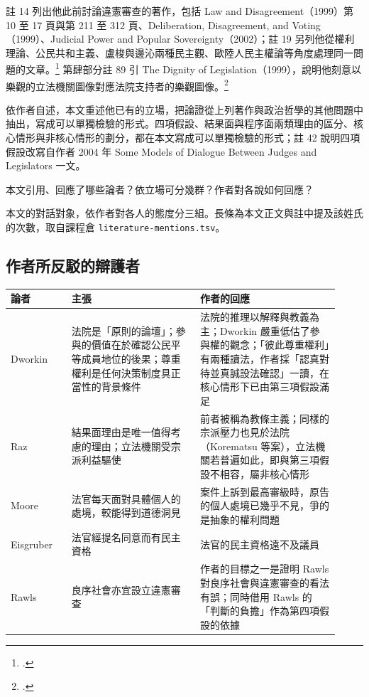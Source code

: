 註 14 列出他此前討論違憲審查的著作，包括 Law and Disagreement（1999）第 10 至 17 頁與第 211 至 312 頁、Deliberation, Disagreement, and Voting（1999）、Judicial Power and Popular Sovereignty（2002）；註 19 另列他從權利理論、公民共和主義、盧梭與邊沁兩種民主觀、歐陸人民主權論等角度處理同一問題的文章。\footcite{waldron1999lad} 第肆部分註 89 引 The Dignity of Legislation（1999），說明他刻意以樂觀的立法機關圖像對應法院支持者的樂觀圖像。\footcite{waldron1999dignity}

依作者自述，本文重述他已有的立場，把論證從上列著作與政治哲學的其他問題中抽出，寫成可以單獨檢驗的形式。四項假設、結果面與程序面兩類理由的區分、核心情形與非核心情形的劃分，都在本文寫成可以單獨檢驗的形式；註 42 說明四項假設改寫自作者 2004 年 Some Models of Dialogue Between Judges and Legislators 一文。


\begin{qaquestion}
本文引用、回應了哪些論者？依立場可分幾群？作者對各說如何回應？
\end{qaquestion}

\begin{qafigure}{本文的對話對象，依作者對各人的態度分三組。長條為本文正文與註中提及該姓氏的次數，取自課程倉 \texttt{literature-mentions.tsv}。\label{fig:interlocutors}}

\end{qafigure}

\subsection{作者所反駁的辯護者}

\begin{longtable}{@{}L{0.17\linewidth}L{0.36\linewidth}L{0.39\linewidth}@{}}
\toprule
論者 & 主張 & 作者的回應 \\
\midrule
\endhead
Dworkin & 法院是「原則的論壇」；參與的價值在於確認公民平等成員地位的後果；尊重權利是任何決策制度具正當性的背景條件 & 法院的推理以解釋與教義為主；Dworkin 嚴重低估了參與權的觀念；「彼此尊重權利」有兩種讀法，作者採「認真對待並真誠設法確認」一讀，在核心情形下已由第三項假設滿足 \\
Raz & 結果面理由是唯一值得考慮的理由；立法機關受宗派利益驅使 & 前者被稱為教條主義；同樣的宗派壓力也見於法院（Korematsu 等案），立法機關若普遍如此，即與第三項假設不相容，屬非核心情形 \\
Moore & 法官每天面對具體個人的處境，較能得到道德洞見 & 案件上訴到最高審級時，原告的個人處境已幾乎不見，爭的是抽象的權利問題 \\
Eisgruber & 法官經提名同意而有民主資格 & 法官的民主資格遠不及議員 \\
Rawls & 良序社會亦宜設立違憲審查 & 作者的目標之一是證明 Rawls 對良序社會與違憲審查的看法有誤；同時借用 Rawls 的「判斷的負擔」作為第四項假設的依據 \\
\bottomrule
\end{longtable}


